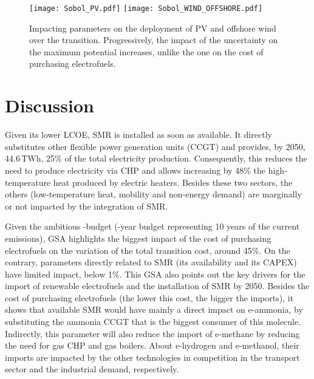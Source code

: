\begin{figure}[htbp!]
\centering
\texttt{[image: Sobol\_PV.pdf]}
\texttt{[image: Sobol\_WIND\_OFFSHORE.pdf]}
\caption{Impacting parameters on the deployment of \gls{PV} and offshore wind over the transition. Progressively, the impact of the uncertainty on the maximum potential increases, unlike the one on the cost of purchasing electrofuels.}
\label{fig:results_uq_pdf_local_ren}
\end{figure}


\section{Discussion}
\label{sec:atom_mol:discuss}
Given its lower \gls{LCOE}, \gls{SMR} is installed as soon as available. It directly substitutes other flexible power generation units (\ie CCGT) and provides, by 2050, 44.6\,TWh, 25\% of the total electricity production. Consequently, this reduces the need to produce electricity via \gls{CHP} and allows increasing by 48\% the high-temperature heat produced by electric heaters. Besides these two sectors, the others (\ie low-temperature heat, mobility and non-energy demand) are marginally or not impacted by the integration of \gls{SMR}.

Given the ambitious -budget (-year budget representing 10 years of the current emissions), \acrfull{GSA} highlights the biggest impact of the cost of purchasing electrofuels on the variation of the total transition cost, around 45\%. On the contrary, parameters directly related to \gls{SMR} (\ie its availability and its CAPEX) have limited impact, below 1\%. This \gls{GSA} also points out the key drivers for the import of renewable electrofuels and the installation of \gls{SMR} by 2050. Besides the cost of purchasing electrofuels (\ie the lower this cost, the bigger the imports), it shows that available \gls{SMR} would have mainly a direct impact on e-ammonia, by substituting the ammonia \gls{CCGT} that is the biggest consumer of this molecule. Indirectly, this parameter will also reduce the import of e-methane by reducing the need for gas \gls{CHP} and gas boilers. About e-hydrogen and e-methanol, their imports are impacted by the other technologies in competition in the transport sector and the industrial demand, respectively.

